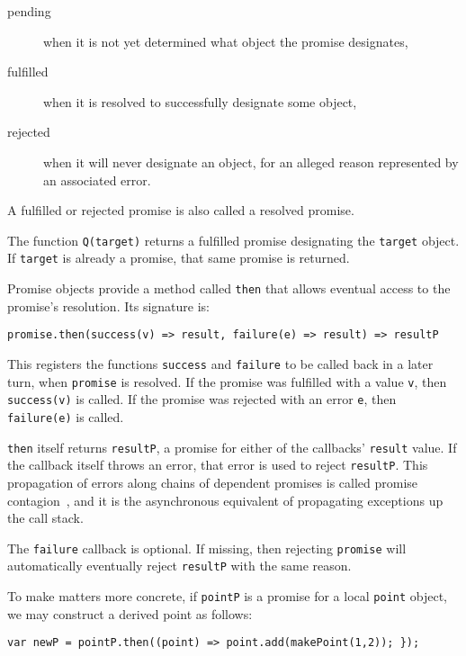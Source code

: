 \documentclass{llncs}
\begin{document}
\begin{description}
  \item[pending] when it is not yet determined what object the promise designates,
  \item[fulfilled] when it is resolved to successfully designate some object,
  \item[rejected] when it will never designate an object, for an alleged reason represented by an associated error.
\end{description}

A fulfilled or rejected promise is also called a resolved promise.

The function \texttt{Q(target)} returns a fulfilled promise designating the \texttt{target} object. If \texttt{target} is already a promise, that same promise is returned.

Promise objects provide a method called \texttt{then} that allows eventual access to the promise's resolution. Its signature is:

\begin{verbatim}
promise.then(success(v) => result, failure(e) => result) => resultP
\end{verbatim}

This registers the functions \texttt{success} and \texttt{failure} to be called back in a later turn, when \texttt{promise} is resolved. If the promise was fulfilled with a value \texttt{v}, then \texttt{success(v)} is called. If the promise was rejected with an error \texttt{e}, then \texttt{failure(e)} is called.

\texttt{then} itself returns \texttt{resultP}, a promise for either of the callbacks' \texttt{result} value. If the callback itself throws an error, that error is used to reject \texttt{resultP}. This propagation of errors along chains of dependent promises is called promise contagion~\cite{miller:strangers}, and it is the asynchronous equivalent of propagating exceptions up the call stack.

The \texttt{failure} callback is optional. If missing, then rejecting \texttt{promise} will automatically eventually reject \texttt{resultP} with the same reason.

To make matters more concrete, if \texttt{pointP} is a promise for a local \texttt{point} object, we may construct a derived point as follows:

\begin{verbatim}
var newP = pointP.then((point) => point.add(makePoint(1,2)); });
\end{verbatim}
\end{document}
